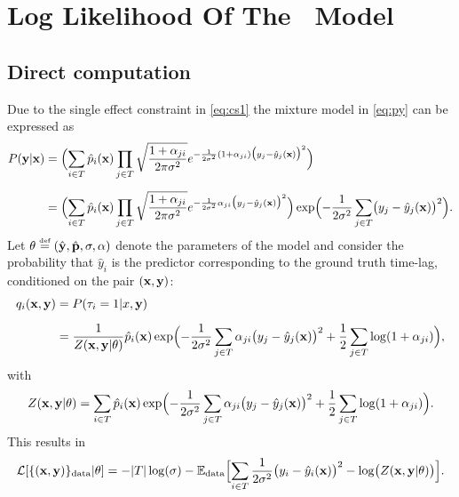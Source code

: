 \chapter{Log Likelihood Of The \XX \ Model}\label{app:LL}

\section*{Direct computation}
Due to the single effect constraint in \cref{eq:cs1} the mixture model in 
\cref{eq:py} can be expressed as  
\begin{align*}
P({\bf y}\vert \mathbf{x}) &= \Bigl(\sum_{i\in T}\hat p_i(\mathbf{x})\prod_{j\in T}\sqrt{\frac{1+\alpha_{ji}}{2\pi\sigma^2}}e^{-\frac{1}{2\sigma^2}(1+\alpha_{ji})\bigl(y_j-\hat y_j(\mathbf{x})\bigr)^2}\Bigr)\\[0.2cm]
&= \Bigl(\sum_{i\in T}\hat p_i(\mathbf{x})\prod_{j\in T}\sqrt{\frac{1+\alpha_{ji}}{2\pi\sigma^2}}e^{-\frac{1}{2\sigma^2}\alpha_{ji}\bigl(y_j-\hat y_j(\mathbf{x})\bigr)^2}\Bigr)
\exp\Bigl(-\frac{1}{2\sigma^2}\sum_{j\in T}\bigl(y_j-\hat y_j(\mathbf{x})\bigr)^2\Bigr).
\end{align*}
Let $\theta \stackrel{\mbox{\upshape\tiny def}}{=} (\hat {\bf y},\hat{\bf p},\sigma,{\bf \alpha})$ denote the 
parameters of the model and consider the probability that $\hat y_i$ is the 
predictor corresponding to the ground truth time-lag, conditioned on the pair 
$(\mathbf{x},{\bf y})$: 
\begin{align*}
  q_i(\mathbf{x},{\bf y}) &= P(\tau_i=1 \vert x,{\bf y})\\[0.2cm]
  &= \frac{1}{Z(\mathbf{x},{\bf y}\vert\theta)}
  \hat p_i(\mathbf{x})\exp\Bigl(-\frac{1}{2\sigma^2}\sum_{j\in  T}\alpha_{ji}\bigl(y_j-\hat y_j(\mathbf{x})\bigr)^2+\frac{1}{2}\sum_{j\in  T}\log(1+\alpha_{ji})\Bigr),
\end{align*}
with
\[
Z(\mathbf{x},{\bf y}\vert\theta) = \sum_{i\in T}  \hat p_i(\mathbf{x})\exp\Bigl(-\frac{1}{2\sigma^2}\sum_{j\in  T}\alpha_{ji}\bigl(y_j-\hat y_j(\mathbf{x})\bigr)^2+\frac{1}{2}\sum_{j\in  T}\log(1+\alpha_{ji})\Bigr).
\]
This results in 
\[
  {\cal L}[\{(\mathbf{x},{\bf y})\}_{\rm data}\vert\theta] = -\vert  T\vert\log(\sigma)-{\mathbb E}_{\rm data}
  \Bigl[\sum_{i\in T}\frac{1}{2\sigma^2}\bigl(y_i-\hat y_i(\mathbf{x})\bigr)^2-\log\bigl(Z(\mathbf{x},{\bf y}\vert\theta)\bigr)\Bigr].
\]

